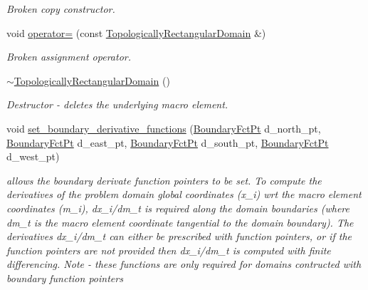 \begin{DoxyCompactItemize}
\begin{DoxyCompactList}\small\item\em Broken copy constructor. \end{DoxyCompactList}\item 
void \hyperlink{classoomph_1_1TopologicallyRectangularDomain_ab04f175b5baff51c457c51252880b1ff}{operator=} (const \hyperlink{classoomph_1_1TopologicallyRectangularDomain}{Topologically\+Rectangular\+Domain} \&)
\begin{DoxyCompactList}\small\item\em Broken assignment operator. \end{DoxyCompactList}\item 
\hyperlink{classoomph_1_1TopologicallyRectangularDomain_aa7b1e4911a2b0ac8f599819faa2c9b27}{$\sim$\+Topologically\+Rectangular\+Domain} ()
\begin{DoxyCompactList}\small\item\em Destructor -\/ deletes the underlying macro element. \end{DoxyCompactList}\item 
void \hyperlink{classoomph_1_1TopologicallyRectangularDomain_a86e606d9635f02462fd4f1ef07cd09d4}{set\+\_\+boundary\+\_\+derivative\+\_\+functions} (\hyperlink{classoomph_1_1TopologicallyRectangularDomain_a8b2e24f5500d86c93aef509c5410e7cc}{Boundary\+Fct\+Pt} d\+\_\+north\+\_\+pt, \hyperlink{classoomph_1_1TopologicallyRectangularDomain_a8b2e24f5500d86c93aef509c5410e7cc}{Boundary\+Fct\+Pt} d\+\_\+east\+\_\+pt, \hyperlink{classoomph_1_1TopologicallyRectangularDomain_a8b2e24f5500d86c93aef509c5410e7cc}{Boundary\+Fct\+Pt} d\+\_\+south\+\_\+pt, \hyperlink{classoomph_1_1TopologicallyRectangularDomain_a8b2e24f5500d86c93aef509c5410e7cc}{Boundary\+Fct\+Pt} d\+\_\+west\+\_\+pt)
\begin{DoxyCompactList}\small\item\em allows the boundary derivate function pointers to be set. To compute the derivatives of the problem domain global coordinates (x\+\_\+i) wrt the macro element coordinates (m\+\_\+i), dx\+\_\+i/dm\+\_\+t is required along the domain boundaries (where dm\+\_\+t is the macro element coordinate tangential to the domain boundary). The derivatives dx\+\_\+i/dm\+\_\+t can either be prescribed with function pointers, or if the function pointers are not provided then dx\+\_\+i/dm\+\_\+t is computed with finite differencing. Note -\/ these functions are only required for domains contructed with boundary function pointers \end{DoxyCompactList}\item 

\end{DoxyCompactItemize}
